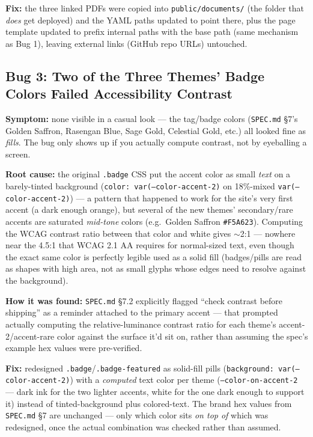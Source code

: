 \documentclass[11pt]{article}
\begin{document}
\textbf{Fix:} the three linked PDFs were copied into
\texttt{public/documents/} (the folder that \emph{does} get deployed)
and the YAML paths updated to point there, plus the page template
updated to prefix internal paths with the base path (same mechanism as
Bug 1), leaving external links (GitHub repo URLs) untouched.

\subsection{Bug 3: Two of the Three Themes' Badge Colors Failed Accessibility Contrast}

\textbf{Symptom:} none visible in a casual look --- the tag/badge colors
(\texttt{SPEC.md} \S7's Golden Saffron, Rasengan Blue, Sage Gold,
Celestial Gold, etc.) all looked fine as \emph{fills}. The bug only shows
up if you actually compute contrast, not by eyeballing a screen.

\textbf{Root cause:} the original \texttt{.badge} CSS put the accent
color as small \emph{text} on a barely-tinted background
(\texttt{color: var(--color-accent-2)} on 18\%-mixed
\texttt{var(--color-accent-2)}) --- a pattern that happened to work for
the site's very first accent (a dark enough orange), but several of the
new themes' secondary/rare accents are saturated \emph{mid-tone} colors
(e.g.\ Golden Saffron \texttt{\#F5A623}). Computing the WCAG contrast
ratio between that color and white gives $\sim$2:1 --- nowhere near the
4.5:1 that WCAG 2.1 AA requires for normal-sized text, even though the
exact same color is perfectly legible used as a solid fill (badges/pills
are read as shapes with high area, not as small glyphs whose edges need
to resolve against the background).

\textbf{How it was found:} \texttt{SPEC.md} \S7.2 explicitly flagged
``check contrast before shipping'' as a reminder attached to the primary
accent --- that prompted actually computing the relative-luminance
contrast ratio for each theme's accent-2/accent-rare color against the
surface it'd sit on, rather than assuming the spec's example hex values
were pre-verified.

\textbf{Fix:} redesigned \texttt{.badge}/\texttt{.badge-featured} as
solid-fill pills (\texttt{background: var(--color-accent-2)}) with a
\emph{computed} text color per theme (\texttt{--color-on-accent-2} ---
dark ink for the two lighter accents, white for the one dark enough to
support it) instead of tinted-background plus colored-text. The brand hex
values from \texttt{SPEC.md} \S7 are unchanged --- only which color sits
\emph{on top of} which was redesigned, once the actual combination was
checked rather than assumed.
\end{document}
